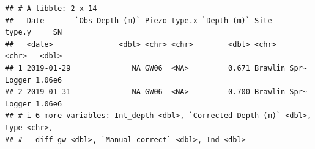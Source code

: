 \documentclass[
]{article}
\newenvironment{Shaded}{\begin{snugshade}}{\end{snugshade}}
\newcommand{\AttributeTok}[1]{\textcolor[rgb]{0.13,0.29,0.53}{#1}}
\newcommand{\CommentTok}[1]{\textcolor[rgb]{0.56,0.35,0.01}{\textit{#1}}}
\newcommand{\ConstantTok}[1]{\textcolor[rgb]{0.56,0.35,0.01}{#1}}
\newcommand{\DecValTok}[1]{\textcolor[rgb]{0.00,0.00,0.81}{#1}}
\newcommand{\FunctionTok}[1]{\textcolor[rgb]{0.13,0.29,0.53}{\textbf{#1}}}
\newcommand{\NormalTok}[1]{#1}
\newcommand{\OtherTok}[1]{\textcolor[rgb]{0.56,0.35,0.01}{#1}}
\newcommand{\SpecialCharTok}[1]{\textcolor[rgb]{0.81,0.36,0.00}{\textbf{#1}}}
\newcommand{\StringTok}[1]{\textcolor[rgb]{0.31,0.60,0.02}{#1}}
\begin{document}
\begin{verbatim}
## # A tibble: 2 x 14
##   Date       `Obs Depth (m)` Piezo type.x `Depth (m)` Site         type.y     SN
##   <date>               <dbl> <chr> <chr>        <dbl> <chr>        <chr>   <dbl>
## 1 2019-01-29              NA GW06  <NA>         0.671 Brawlin Spr~ Logger 1.06e6
## 2 2019-01-31              NA GW06  <NA>         0.700 Brawlin Spr~ Logger 1.06e6
## # i 6 more variables: Int_depth <dbl>, `Corrected Depth (m)` <dbl>, type <chr>,
## #   diff_gw <dbl>, `Manual correct` <dbl>, Ind <dbl>
\end{verbatim}

\begin{Shaded}
\end{Shaded}
\end{document}
